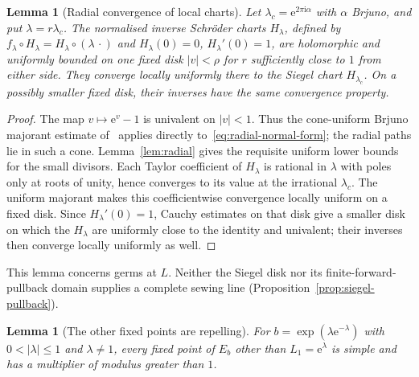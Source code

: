 \documentclass[11pt]{amsart}
\newtheorem{lemma}[theorem]{Lemma}
\theoremstyle{definition}
\newcommand{\eee}{\mathrm{e}}
\newcommand{\ii}{\mathrm{i}}
\begin{document}
\begin{lemma}[Radial convergence of local charts]\label{lem:radial-chart}
Let $\lambda_c=\eee^{2\pi\ii\alpha}$ with $\alpha$ Brjuno, and put
$\lambda=r\lambda_c$.  The normalised inverse Schr\"oder charts
$H_\lambda$, defined by
$f_\lambda\circ H_\lambda=H_\lambda\circ(\lambda\,\cdot)$ and
$H_\lambda(0)=0$, $H_\lambda'(0)=1$, are holomorphic and uniformly
bounded on one fixed disk $|v|<\rho$ for $r$ sufficiently close to $1$
from either side.  They converge locally uniformly there to the Siegel
chart $H_{\lambda_c}$.  On a possibly smaller fixed disk, their inverses
have the same convergence property.
\end{lemma}

\begin{proof}
The map $v\mapsto\eee^v-1$ is univalent on $|v|<1$.  Thus the
cone-uniform Brjuno majorant estimate of~\cite{MarmiCarminati2008}
applies directly to~\eqref{eq:radial-normal-form}; the radial paths lie in
such a cone.  Lemma~\ref{lem:radial} gives the requisite uniform lower
bounds for the small divisors.  Each Taylor coefficient of $H_\lambda$ is
rational in $\lambda$ with poles only at roots of unity, hence converges to
its value at the irrational $\lambda_c$.  The uniform majorant makes this
coefficientwise convergence locally uniform on a fixed disk.  Since
$H_\lambda'(0)=1$, Cauchy estimates on that disk give a smaller disk on
which the $H_\lambda$ are uniformly close to the identity and univalent;
their inverses then converge locally uniformly as well.
\end{proof}

This lemma concerns germs at $L$.  Neither the Siegel disk nor its
finite-forward-pullback domain supplies a complete sewing line
(Proposition~\ref{prop:siegel-pullback}).

\begin{lemma}[The other fixed points are repelling]
\label{lem:boundary-repelling}
For $b=\exp(\lambda\eee^{-\lambda})$ with $0<|\lambda|\le1$ and
$\lambda\ne1$, every fixed point of $E_b$ other than $L_1=\eee^\lambda$
is simple and has a multiplier of modulus greater than $1$.
\end{lemma}
\end{document}
